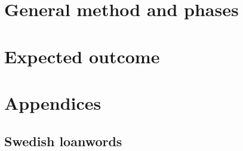 \documentclass[a4paper]{article}
\begin{document}


\section{General method and phases}




\section{Expected outcome}



%

\section{Appendices}


\subsection{Swedish loanwords}


\end{document}
